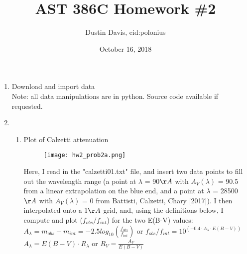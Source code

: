 \documentclass[11pt]{article}
\title{AST 386C Homework \#2}
\author{Dustin Davis, eid:polonius}
\date{October 16, 2018}
\begin{document}
\maketitle



\newpage 



\begin{enumerate}
\item 
	Download and import data\\

	Note: all data manipulations are in python. Source code available if requested.\\

\item  %
	
	\begin{enumerate}
    \item Plot of Calzetti attenuation\\
    
   		\begin{figure}[H]
		    \texttt{[image: hw2\_prob2a.png]}
		    \caption{}
		    \label{}
   		\end{figure}
    
	    Here, I read in the "calzetti01.txt" file, and insert two data points to fill out the wavelength range (a point at $\lambda$ = 90$\AA$ with $A_V(\lambda)$ = 90.5 from a linear extrapolation on the blue end, and a point at $\lambda$ = 28500 $\AA$ with $A_V(\lambda)$ = 0 from Battisti, Calzetti, Chary [2017]). I then interpolated onto a 1$\AA$ grid, and, using the definitions below, I compute and plot ($f_{obs}/f_{int}$) for the two E(B-V) values:
    	\\
    	
    	\hspace{10mm} $A_{\lambda} = m_{obs} - m_{int} = -2.5log_{10}(\frac{\displaystyle f_{obs}}{\displaystyle f_{int}})$ \hspace{5mm} or \hspace{5mm} $f_{obs}/f_{int} = 10^{(-0.4 \cdot A_{\lambda} \cdot E(B-V))}$ \\
    	
		\hspace{10mm}	$A_{\lambda} = E(B-V) \cdot R_{\lambda}$ \hspace{5mm} or \hspace{5mm} $R_V = \frac{\displaystyle A_V}{\displaystyle E(B-V)}$\\	
    	

\end{enumerate}
\end{enumerate}
\end{document}

